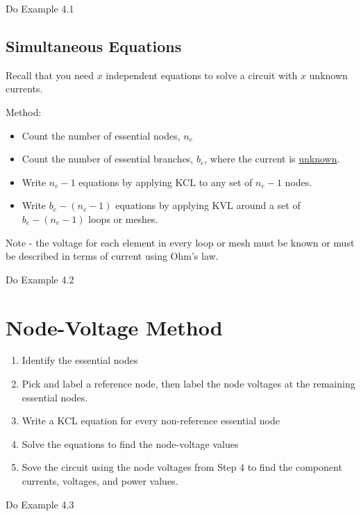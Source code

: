 \documentclass[14pt]{memoir}
\begin{document}
\begin{tcolorbox}
Do Example 4.1
\end{tcolorbox}


\subsection{Simultaneous Equations}

Recall that you need $x$ independent equations to solve a circuit with $x$ unknown currents.

Method:
\begin{itemize}
\item Count the number of essential nodes, $n_e$
\item Count the number of essential branches, $b_e$, where the current is \underline{unknown}.
\item Write $n_e - 1$ equations by applying KCL to any set of $n_e - 1$ nodes.
\item Write $b_e - (n_e - 1)$ equations by applying KVL around a set of $b_e - (n_e - 1)$ loops or meshes. 
\end{itemize}

Note - the voltage for each element in every loop or mesh must be known or must be described in terms of current using Ohm's law.

\begin{tcolorbox}
Do Example 4.2
\end{tcolorbox}

\section{Node-Voltage Method}

\begin{enumerate}
\item Identify the essential nodes
\item Pick and label a reference node, then label the node voltages at the remaining essential nodes. 
\item Write a KCL equation for every non-reference essential node
\item Solve the equations to find the node-voltage values
\item Sove the circuit using the node voltages from Step 4 to find the component currents, voltages, and power values.  
\end{enumerate}

\begin{tcolorbox}
Do Example 4.3
\end{tcolorbox}
\end{document}
